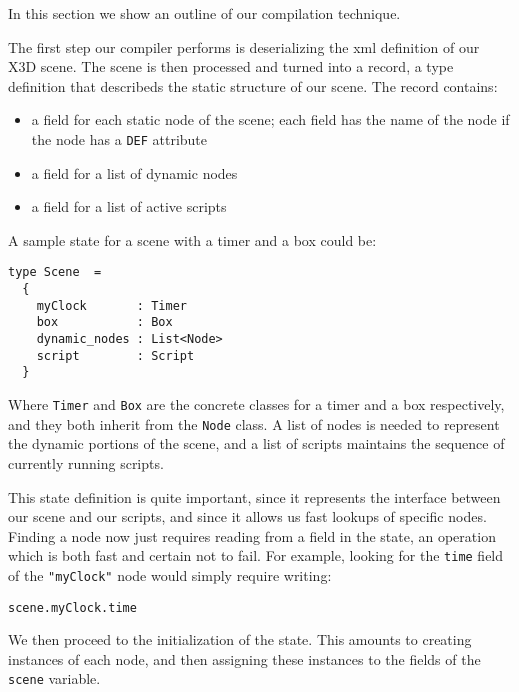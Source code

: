 
In this section we show an outline of our compilation technique. 

The first step our compiler performs is deserializing the xml definition of our X3D scene. The scene is then processed and turned into a record, a type definition that describeds the static structure of our scene. The record contains:

\begin{itemize}
\addtolength{\itemsep}{-0.5\baselineskip}
\item a field for each static node of the scene; each field has the name of the node if the node has a \texttt{DEF} attribute
\item a field for a list of dynamic nodes
\item a field for a list of active scripts
\end{itemize}

A sample state for a scene with a timer and a box could be:

\begin{lstlisting}
type Scene  =
  {
    myClock       : Timer 
    box           : Box
    dynamic_nodes : List<Node>
    script        : Script
  }
\end{lstlisting}

Where \texttt{Timer} and \texttt{Box} are the concrete classes for a timer and a box respectively, and they both inherit from the \texttt{Node} class.
A list of nodes is needed to represent the dynamic portions of the scene, and a list of scripts maintains the sequence of currently running scripts.

This state definition is quite important, since it represents the interface between our scene and our scripts, and since it allows us fast lookups of specific nodes. Finding a node now just requires reading from a field in the state, an operation which is both fast and certain not to fail. For example, looking for the \texttt{time} field of the \texttt{"myClock"} node would simply require writing:

\begin{lstlisting}
scene.myClock.time
\end{lstlisting}

We then proceed to the initialization of the state. This amounts to creating instances of each node, and then assigning these instances to the fields of the \texttt{scene} variable.

